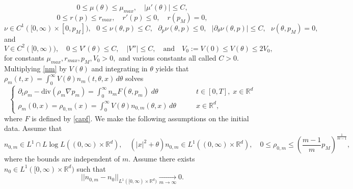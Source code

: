 \documentclass{amsart}
\def\R{\mathbb R}
\begin{document}
\begin{equation}\label{a.beta}
0 \leq \mu(\theta)\leq \mu_{max}, \quad |\mu'(\theta)|\leq C,
\end{equation} 
\begin{equation}\label{a.r}
0\leq r(p)\leq r_{max}, \quad r'(p)\leq 0, \quad r(p_M)=0 ,
\end{equation}
\begin{equation}\label{a.nu}\nu \in C^1([0,\infty)\times[0,p_M]), \text{ }0 \leq\nu(\theta,p) \leq C, \text{ } \partial_p \nu(\theta,p)\leq 0, \text{ } |\partial_\theta \nu(\theta,p)|\leq C, \text{ } \nu(\theta,p_M)=0,  \end{equation} 
 and
\begin{equation}\label{v.assum}  
V \in C^2([0,\infty)), \quad 0\leq V'(\theta)\leq C, \quad |V''|\leq C, \quad \text{and} \quad V_0:=V(0)\leq V(\theta)\leq 2V_0,
\end{equation}
for constants $\mu_{max}, r_{max},p_M, V_0>0,$ and various constants all called $C>0$.
Multiplying \eqref{nm} by $V(\theta)$ and integrating in $\theta$ yields that $\rho_m(t,x)=\int_{0}^{\infty}V(\theta)n_m(t,\theta,x)\,d\theta$ solves
\begin{equation}\label{rho.comp}
\begin{cases}
    \partial_t \rho_m -\text{div}(\rho_m\nabla p_m)=\int_{0}^{\infty}n_mF(\theta,p_m)\;d\theta\qquad & t \in [0,T],\;x \in \R^d
    \\
    \rho_m(0,x)=\rho_{0,m}(x)=\int_{0}^{\infty}V(\theta)n_{0,m}(\theta,x)\,d\theta \qquad & x \in \R^d,
    \end{cases}
\end{equation}
where $F$ is defined by \eqref{capf}.
We make the following assumptions on the initial data. Assume that
\begin{equation}\label{assumpinit}
    n_{0,m} \in L^1\cap L \log L ( (0,\infty)\times \R^d), \quad (|x|^2+\theta) n_{0,m} \in L^1 ( (0,\infty)\times \R^d), \quad 0\leq \rho_{0,m} \leq (\frac{m-1}{m}p_M)^{\frac{1}{m-1}},
\end{equation}
where the bounds are independent of $m$.
Assume there exists $n_{0}\in L^1([0,\infty)\times\R^d)$ such that \begin{equation}\label{initconv}||n_{0,m} - n_{0}||_{L^1([0,\infty)\times \R^d)}\xrightarrow[m\rightarrow \infty]{} 0.\end{equation}
\end{document}
